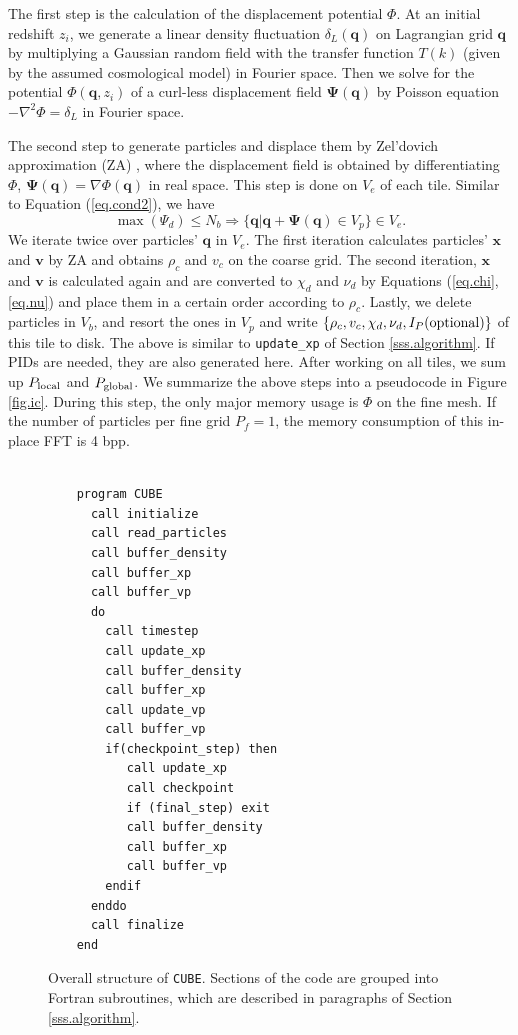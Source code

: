 \documentclass[10pt,twocolumn,preprint]{emulateapj}
\newcommand{\bs}{\boldsymbol}
\begin{document}
The first step is the calculation of the displacement potential $\Phi$. At an initial redshift $z_i$, we generate a linear density fluctuation $\delta_L({\bs q})$ on Lagrangian grid ${\bs q}$ by multiplying a Gaussian random field with the transfer function $T(k)$ (given by the assumed cosmological model) in Fourier space. Then we solve for the potential ${\Phi({\bs q}, z_i)}$ of a curl-less displacement field ${\bs\Psi({\bs q})}$ by Poisson equation $-\nabla^2\Phi=\delta_L$ in Fourier space.

The second step to generate particles and displace them by Zel'dovich approximation (ZA) \citep{1970A&A.....5...84Z}, where the displacement field is obtained by differentiating $\Phi$, ${\bs \Psi}({\bs q})=\nabla\Phi({\bs q})$ in real space. This step is done on $V_e$ of each tile. Similar to Equation (\ref{eq.cond2}), we have
\begin{equation}\label{eq.cond3}
	\max(\Psi_d) \leq N_b \Rightarrow \{ {\bs q} | {\bs q}+{\bs \Psi}({\bs q})\in V_p\} \in V_e.
\end{equation}
We iterate twice over particles' ${\bs q}$ in $V_e$. The first iteration calculates particles' ${\bs x}$ and ${\bs v}$ by ZA and obtains $\rho_c$ and $v_c$ on the coarse grid. The second iteration, ${\bs x}$ and ${\bs v}$ is calculated again and are converted to $\chi_d$ and $\nu_d$ by Equations (\ref{eq.chi},\ref{eq.nu}) and place them in a certain order according to $\rho_c$. Lastly, we delete particles in $V_b$, and resort the ones in $V_p$ and write $\{\rho_c,v_c,\chi_d,\nu_d,I_P({\rm optional})\}$ of this tile to disk. The above is similar to {\tt update\_xp} of Section \ref{sss.algorithm}. If PIDs are needed, they are also generated here.
After working on all tiles, we sum up $P_{\rm local}$ and $P_{\rm global}$. We summarize the above steps into a pseudocode in Figure \ref{fig.ic}. During this step, the only major memory usage is $\Phi$ on the fine mesh. If the number of particles per fine grid $P_f=1$, the memory consumption of this in-place FFT is 4 bpp.


\begin{figure}[]
\begin{verbatim}

    program CUBE
      call initialize
      call read_particles
      call buffer_density
      call buffer_xp
      call buffer_vp
      do
        call timestep
        call update_xp
        call buffer_density
        call buffer_xp
        call update_vp
        call buffer_vp
        if(checkpoint_step) then
           call update_xp
           call checkpoint
           if (final_step) exit
           call buffer_density
           call buffer_xp
           call buffer_vp
        endif
      enddo
      call finalize
    end
\end{verbatim}
\caption{Overall structure of {\tt CUBE}. Sections of the code are grouped into Fortran subroutines, which are described in paragraphs of Section \ref{sss.algorithm}.}
\label{fig.code}
\end{figure}
\end{document}

